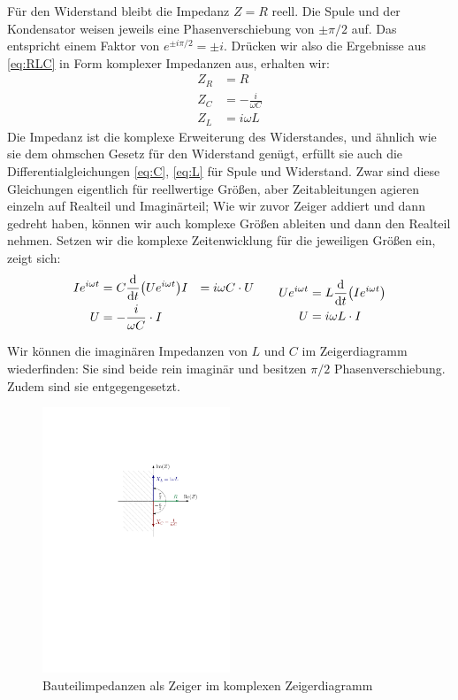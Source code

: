 Für den Widerstand bleibt die Impedanz $Z = R$ reell. Die Spule und der Kondensator weisen jeweils eine
Phasenverschiebung von $\pm \pi/2$ auf. Das entspricht einem Faktor von $e^{\pm i\pi/2}= \pm i$. Drücken wir also die
Ergebnisse aus \eqref{eq:RLC} in Form komplexer Impedanzen aus, erhalten wir:
\begin{align}
    Z_R &= R \\
    Z_C &= -\frac i{\omega C} \\
    Z_L &= i\omega L
\end{align}
Die Impedanz ist die komplexe Erweiterung des Widerstandes, und ähnlich wie sie dem ohmschen Gesetz für den Widerstand
genügt, erfüllt sie auch die Differentialgleichungen \eqref{eq:C}, \eqref{eq:L} für Spule und Widerstand. Zwar sind
diese Gleichungen eigentlich für reellwertige Größen, aber Zeitableitungen agieren einzeln auf Realteil und
Imaginärteil; Wie wir zuvor Zeiger addiert und dann gedreht haben, können wir auch komplexe Größen ableiten und dann den
Realteil nehmen. Setzen wir die komplexe Zeitenwicklung für die jeweiligen Größen ein, zeigt sich:
\begin{gather*}
    \begin{aligned}
        Ie^{i\omega t} &= C\dv{t}(Ue^{i\omega t})
        I &= i\omega C \cdot U \\
        U &= - \frac{i}{\omega C} \cdot I
    \end{aligned}
    \qquad
    \begin{aligned}
        Ue^{i\omega t} &= L\dv{t}(Ie^{i\omega t}) \\
        U &= i\omega L \cdot I
    \end{aligned}
\end{gather*}

Wir können die imaginären Impedanzen von $L$ und $C$ im Zeigerdiagramm wiederfinden: Sie sind beide
rein imaginär und besitzen $\pi/2$ Phasenverschiebung. Zudem sind sie entgegengesetzt.
\begin{figure}[H]
    \centering
    \includegraphics[width=0.5\textwidth]{kCompZeiger.pdf}
    \caption{Bauteilimpedanzen als Zeiger im komplexen Zeigerdiagramm}
\end{figure}
